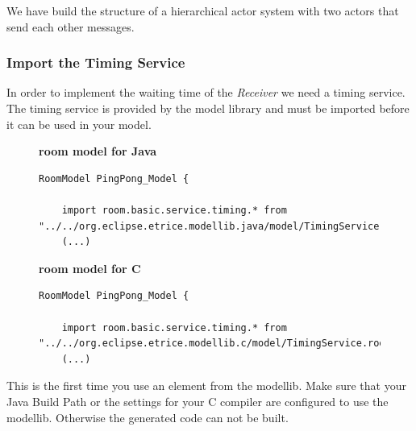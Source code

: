We have build the structure of a hierarchical actor system with two actors that send each other messages.

\subsubsection{Import the Timing Service}

In order to implement the waiting time of the \emph{Receiver} we need a timing service. The timing service is provided by the model library and must be imported before it can be used in your model.

\begin{figure}[ht]
\begin{minipage}[t]{0.50\linewidth}
\begin{mdframed}
	\textbf{room model for Java}
	\newline
\begin{lstlisting}[language=ROOM]
RoomModel PingPong_Model {

	import room.basic.service.timing.* from "../../org.eclipse.etrice.modellib.java/model/TimingService.room"
	(...)
\end{lstlisting}
\end{mdframed}
\end{minipage}
\hspace{0.1cm}
\begin{minipage}[t]{0.50\linewidth}
\begin{mdframed}
	\textbf{room model for C}
	\newline
\begin{lstlisting}[language=ROOM]
RoomModel PingPong_Model {

	import room.basic.service.timing.* from "../../org.eclipse.etrice.modellib.c/model/TimingService.room"
	(...)
\end{lstlisting}
\end{mdframed}
\end{minipage}
\end{figure}

This is the first time you use an element from the modellib. Make sure that your Java Build Path or the settings for your C compiler are configured to use the modellib. Otherwise the generated code can not be built.

